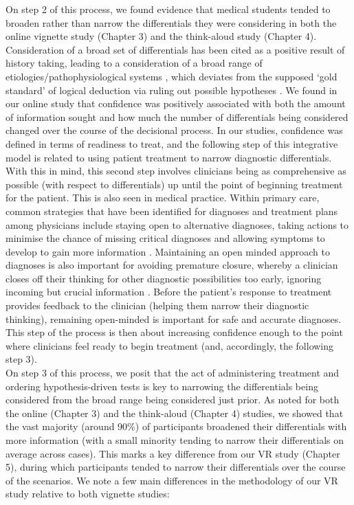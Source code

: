 \documentclass[a4paper, nobind]{templates/ociamthesis}
\begin{document}
On step 2 of this process, we found evidence that medical students tended to broaden rather than narrow the differentials they were considering in both the online vignette study (Chapter 3) and the think-aloud study (Chapter 4). Consideration of a broad set of differentials has been cited as a positive result of history taking, leading to a consideration of a broad range of etiologies/pathophysiological systems \autocite{devries_improving_nodate}, which deviates from the supposed `gold standard' of logical deduction via ruling out possible hypotheses \autocite{kassirer_teaching_1983}. We found in our online study that confidence was positively associated with both the amount of information sought and how much the number of differentials being considered changed over the course of the decisional process. In our studies, confidence was defined in terms of readiness to treat, and the following step of this integrative model is related to using patient treatment to narrow diagnostic differentials. With this in mind, this second step involves clinicians being as comprehensive as possible (with respect to differentials) up until the point of beginning treatment for the patient. This is also seen in medical practice. Within primary care, common strategies that have been identified for diagnoses and treatment plans among physicians include staying open to alternative diagnoses, taking actions to minimise the chance of missing critical diagnoses and allowing symptoms to develop to gain more information \autocite{hewson_strategies_1996}. Maintaining an open minded approach to diagnoses is also important for avoiding premature closure, whereby a clinician closes off their thinking for other diagnostic possibilities too early, ignoring incoming but crucial information \autocite{eva_difficulty_2006}. Before the patient's response to treatment provides feedback to the clinician (helping them narrow their diagnostic thinking), remaining open-minded is important for safe and accurate diagnoses. This step of the process is then about increasing confidence enough to the point where clinicians feel ready to begin treatment (and, accordingly, the following step 3).\\

On step 3 of this process, we posit that the act of administering treatment and ordering hypothesis-driven tests is key to narrowing the differentials being considered from the broad range being considered just prior. As noted for both the online (Chapter 3) and the think-aloud (Chapter 4) studies, we showed that the vast majority (around 90\%) of participants broadened their differentials with more information (with a small minority tending to narrow their differentials on average across cases). This marks a key difference from our VR study (Chapter 5), during which participants tended to narrow their differentials over the course of the scenarios. We note a few main differences in the methodology of our VR study relative to both vignette studies:
\end{document}
